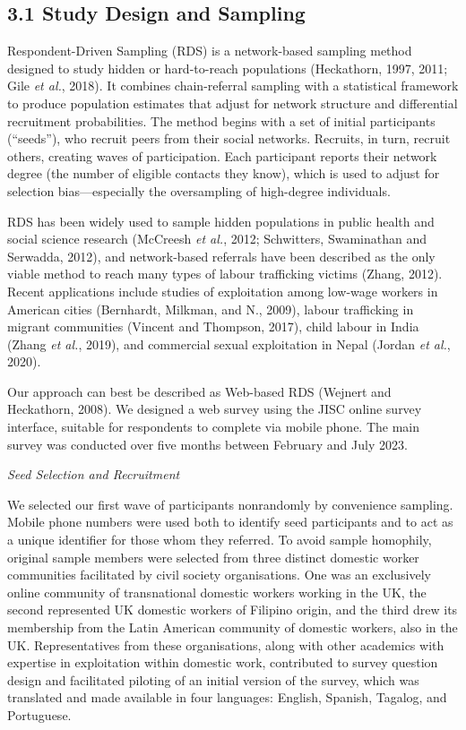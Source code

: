 \documentclass[
  12pt,
  letterpaper,
  DIV=11,
  numbers=noendperiod]{scrartcl}
\begin{document}
\subsection{3.1 Study Design and Sampling}\label{sec-study-design}

Respondent-Driven Sampling (RDS) is a network-based sampling method
designed to study hidden or hard-to-reach populations (Heckathorn, 1997,
2011; Gile \emph{et al.}, 2018). It combines chain-referral sampling
with a statistical framework to produce population estimates that adjust
for network structure and differential recruitment probabilities. The
method begins with a set of initial participants (``seeds''), who
recruit peers from their social networks. Recruits, in turn, recruit
others, creating waves of participation. Each participant reports their
network degree (the number of eligible contacts they know), which is
used to adjust for selection bias---especially the oversampling of
high-degree individuals.

RDS has been widely used to sample hidden populations in public health
and social science research (McCreesh \emph{et al.}, 2012; Schwitters,
Swaminathan and Serwadda, 2012), and network-based referrals have been
described as the only viable method to reach many types of labour
trafficking victims (Zhang, 2012). Recent applications include studies
of exploitation among low-wage workers in American cities (Bernhardt,
Milkman, and N., 2009), labour trafficking in migrant communities
(Vincent and Thompson, 2017), child labour in India (Zhang \emph{et
al.}, 2019), and commercial sexual exploitation in Nepal (Jordan
\emph{et al.}, 2020).

Our approach can best be described as Web-based RDS (Wejnert and
Heckathorn, 2008). We designed a web survey using the JISC online survey
interface, suitable for respondents to complete via mobile phone. The
main survey was conducted over five months between February and July
2023.

\emph{Seed Selection and Recruitment}

We selected our first wave of participants nonrandomly by convenience
sampling. Mobile phone numbers were used both to identify seed
participants and to act as a unique identifier for those whom they
referred. To avoid sample homophily, original sample members were
selected from three distinct domestic worker communities facilitated by
civil society organisations. One was an exclusively online community of
transnational domestic workers working in the UK, the second represented
UK domestic workers of Filipino origin, and the third drew its
membership from the Latin American community of domestic workers, also
in the UK. Representatives from these organisations, along with other
academics with expertise in exploitation within domestic work,
contributed to survey question design and facilitated piloting of an
initial version of the survey, which was translated and made available
in four languages: English, Spanish, Tagalog, and Portuguese.
\end{document}
